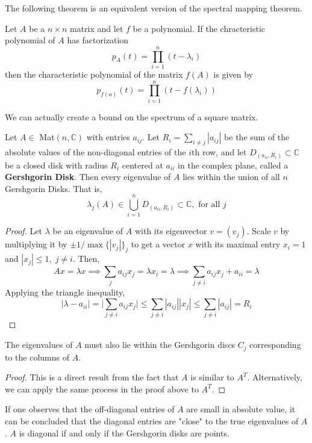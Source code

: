   The following theorem is an equivalent version of the spectral mapping theorem.

  \begin{theorem}
    Let $A$ be a $n \times n$ matrix and let $f$ be a polynomial. If the chracteristic polynomial of $A$ has factorization 
    \[p_A (t) = \prod_{i = 1}^n (t - \lambda_i)\]
    then the characteristic polynomial of the matrix $f(A)$ is given by 
    \[p_{f(a)} (t) = \prod_{i = 1}^n (t - f(\lambda_i))\]
  \end{theorem}

  We can actually create a bound on the spectrum of a square matrix. 

  \begin{theorem}
    Let $A \in $ Mat$(n, \mathbb{C})$ with entries $a_{i j}$. Let $R_i = \sum_{i \neq j} |a_{i j}|$ be the sum of the absolute values of the non-diagonal entries of the $i$th row, and let $D_(a_{i i}, R_i) \subset \mathbb{C}$ be a closed disk with radius $R_i$ centered at $a_{i i}$ in the complex plane, called a \textbf{Gershgorin Disk}. Then every eigenvalue of $A$ lies within the union of all $n$ Gershgorin Disks. That is, 
    \[ \lambda_j (A) \in \bigcup_{i= 1}^{n} D_(a_{i i}, R_i) \subset \mathbb{C}, \text{ for all } j\]
  \end{theorem}
  \begin{proof}
    Let $\lambda$ be an eigenvalue of $A$ with its eigenvector $v = (v_j)$. Scale $v$ by multiplying it by $ \pm 1 / \max{\{|v_j|\}_j}$ to get a vector $x$ with its maximal entry $x_i = 1$ and $|x_j| \leq 1, \; j \neq i$. Then, 
    \[A x = \lambda x \implies \sum_{j} a_{i j} x_j = \lambda x_i = \lambda \implies \sum_{j \neq i} a_{i j} x_j + a_{i i} = \lambda\]
    Applying the triangle inequality, 
    \[| \lambda - a_{i i} | = \bigg| \sum_{j \neq i} a_{i j} x_j\bigg| \leq \sum_{j \neq i} |a_{i j}| |x_j| \leq \sum_{j \neq i} |a_{i j}| = R_i\]
  \end{proof}

  \begin{corollary}
    The eigenvalues of $A$ must also lie within the Gershgorin discs $C_j$ corresponding to the columns of $A$. 
  \end{corollary}
  \begin{proof}
    This is a direct result from the fact that $A$ is similar to $A^T$. Alternatively, we can apply the same process in the proof above to $A^T$.
  \end{proof} 

  If one observes that the off-diagonal entries of $A$ are small in absolute value, it can be concluded that the diagonal entries are "close" to the true eigenvalues of $A$. $A$ is diagonal if and only if the Gershgorin disks are points. 

